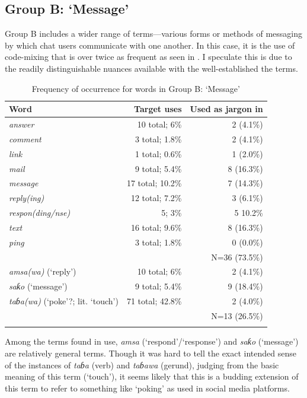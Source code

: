 \documentclass[output=paper
,newtxmath
,modfonts
,nonflat]{langsci/langscibook}
\begin{document}
\subsection{Group B: ‘Message’}

Group B includes a wider range of terms—various forms or methods of messaging by which chat users communicate with one another. In this case, it is the use of  code-mixing that is over twice as frequent as seen in . I speculate this is due to the readily distinguishable nuances available with the well-established the  terms. 

\begin{table}
\begin{tabularx}{\textwidth}{Qrr}
\lsptoprule
Word & Target uses & Used as jargon in \\
\midrule
\textit{answer}           & 10 total; 6\%  & 2 (4.1\%)\\
\textit{comment}          & 3 total; 1.8\% & 2 (4.1\%)\\
\textit{link}             & 1 total; 0.6\% & 1 (2.0\%)\\
\textit{mail}             & 9 total; 5.4\% & 8 (16.3\%)\\
\textit{message}          & 17 total; 10.2\% & 7 (14.3\%)\\
\textit{reply(ing)}       & 12 total; 7.2\% & 3 (6.1\%)\\
\textit{respon(ding/nse)} & 5; 3\% & 5 10.2\%\\
\textit{text}             & 16 total; 9.6\% & 8 (16.3\%)\\
\textit{ping}             & 3 total; 1.8\% & 0 (0.0\%)\\\midrule
& & N=36 (73.5\%)\\\midrule
\textit{amsa(wa)} (‘reply’)                & 10 total; 6\% & 2 (4.1\%)\\
\textit{saƙo} (‘message’)                  & 9 total; 5.4\% & 9 (18.4\%)\\
\textit{taɓa(wa)} (‘poke’?; lit. ‘touch’) & 71 total; 42.8\% & 2 (4.0\%)\\\midrule
& & N=13 (26.5\%)\\
\lspbottomrule
\end{tabularx} 
\caption{Frequency of occurrence for words in Group B: ‘Message’}
\label{tab:purvis:4}
\end{table} 

Among the  terms found in use, \textit{amsa} (‘respond’/‘response’) and \textit{saƙo} (‘message’) are relatively general terms. Though it was hard to tell the exact intended sense of the instances of \textit{taɓa} (verb) and \textit{taɓawa} (gerund), judging from the basic meaning of this term (‘touch’), it seems likely that this is a budding extension of this term to refer to something like ‘poking’ as used in social media platforms. 
\end{document}
